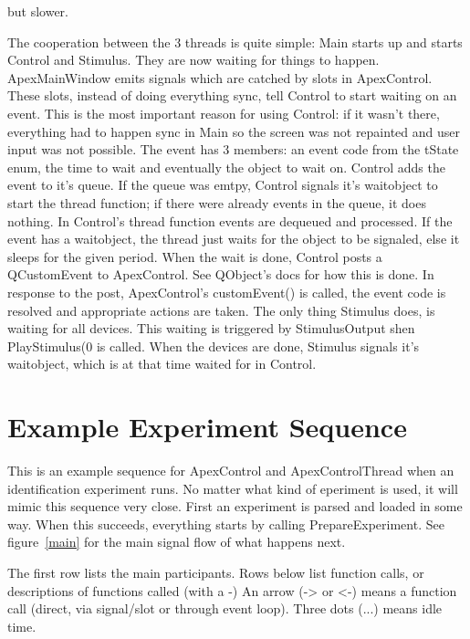 \documentclass[a4paper,12pt]{article}
\begin{document}
but slower.

The cooperation between the 3 threads is quite simple:
Main starts up and starts Control and Stimulus. They are now waiting for things
to happen.
ApexMainWindow emits signals which are catched by slots in ApexControl.
These slots, instead of doing everything sync, tell Control to start waiting on
an event.
This is the most important reason for using Control: if it wasn't there,
everything had to
happen sync in Main so the screen was not repainted and user input was not
possible.
The event has 3 members: an event code from the tState enum, the time to wait
and eventually
the object to wait on.
Control adds the event to it's queue. If the queue was emtpy, Control signals
it's waitobject
to start the thread function; if there were already events in the queue, it does
nothing.
In Control's thread function events are dequeued and processed. If the event has
a waitobject,
the thread just waits for the object to be signaled, else it sleeps for the
given period.
When the wait is done, Control posts a QCustomEvent to ApexControl. See
QObject's docs for how
this is done. In response to the post, ApexControl's customEvent() is called,
the event code is resolved and appropriate actions are taken.
The only thing Stimulus does, is waiting for all devices. This waiting is
triggered by StimulusOutput
shen PlayStimulus(0 is called. When the devices are done, Stimulus signals it's
waitobject, which is at that time waited for in Control.



\section{Example Experiment Sequence}
This is an example sequence for ApexControl and ApexControlThread when an identification experiment runs.
No matter what kind of eperiment is used, it will mimic this sequence very close.
First an experiment is parsed and loaded in some way. When this succeeds, everything starts by calling
PrepareExperiment.
See figure~\ref{main} for the main signal flow of what happens next.

The first row lists the main participants.
Rows below list function calls, or descriptions of functions called (with a -)
An arrow (-> or <-) means a function call (direct, via signal/slot or through event loop).
Three dots (...) means idle time.
\end{document}
